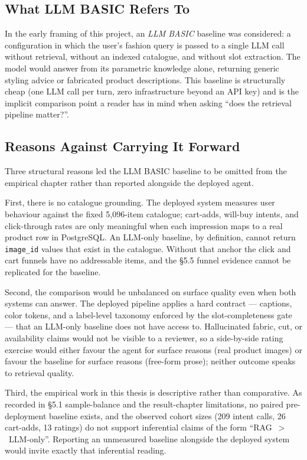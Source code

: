 \subsection{What LLM BASIC Refers To}

In the early framing of this project, an \emph{LLM BASIC} baseline was considered: a configuration in which the user's fashion query is passed to a single LLM call without retrieval, without an indexed catalogue, and without slot extraction. The model would answer from its parametric knowledge alone, returning generic styling advice or fabricated product descriptions. This baseline is structurally cheap (one LLM call per turn, zero infrastructure beyond an API key) and is the implicit comparison point a reader has in mind when asking ``does the retrieval pipeline matter?''.

\subsection{Reasons Against Carrying It Forward}

Three structural reasons led the LLM BASIC baseline to be omitted from the empirical chapter rather than reported alongside the deployed agent.

First, there is no catalogue grounding. The deployed system measures user behaviour against the fixed 5{,}096-item catalogue; cart-adds, will-buy intents, and click-through rates are only meaningful when each impression maps to a real product row in PostgreSQL. An LLM-only baseline, by definition, cannot return \texttt{image\_id} values that exist in the catalogue. Without that anchor the click and cart funnels have no addressable items, and the §5.5 funnel evidence cannot be replicated for the baseline.

Second, the comparison would be unbalanced on surface quality even when both systems can answer. The deployed pipeline applies a hard contract --- captions, color tokens, and a label-level taxonomy enforced by the slot-completeness gate --- that an LLM-only baseline does not have access to. Hallucinated fabric, cut, or availability claims would not be visible to a reviewer, so a side-by-side rating exercise would either favour the agent for surface reasons (real product images) or favour the baseline for surface reasons (free-form prose); neither outcome speaks to retrieval quality.

Third, the empirical work in this thesis is descriptive rather than comparative. As recorded in §5.1 sample-balance and the result-chapter limitations, no paired pre-deployment baseline exists, and the observed cohort sizes (209 intent calls, 26 cart-adds, 13 ratings) do not support inferential claims of the form ``RAG~$>$~LLM-only''. Reporting an unmeasured baseline alongside the deployed system would invite exactly that inferential reading.

